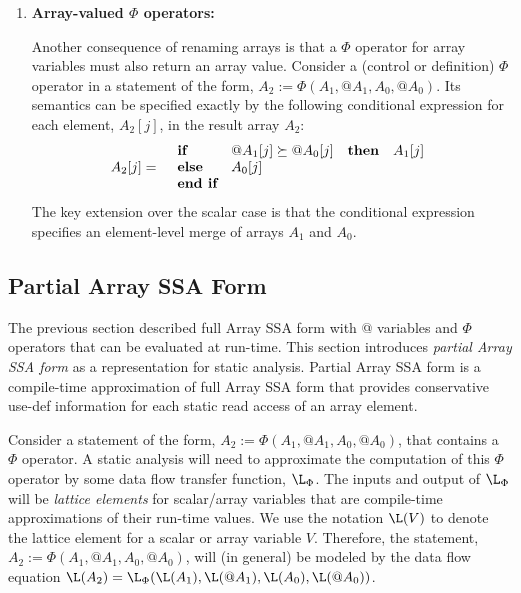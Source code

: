 \begin{enumerate}
\item {\bf Array-valued  $\Phi$ operators:}
\label{array:phi}

Another consequence of renaming arrays is that
a $\Phi$ operator
for array variables must also return an
array value.  Consider a (control or definition) $\Phi$ operator in
a statement of
the form, $A_2 := \Phi(A_1, @A_1, A_0, @A_0)$. Its semantics can be specified exactly
by the following conditional expression
for each element, $A_2[j]$, in the result array $A_2$:
\begin{eqnarray*}
A_2[j] & = &
  \begin{array}{llll}
\mbox{\bf if} & @A_1[j] \succeq @A_0[j] & {\bf then} & A_1[j] \\
\mbox{\bf else} & A_0[j] \\
\mbox{\bf end if}
  \end{array}
\end{eqnarray*}
The key extension over the scalar case is that the conditional expression
specifies an element-level merge of arrays $A_1$ and $A_0$.
\end{enumerate}

\subsection{Partial Array SSA Form}\label{sec:partial}

The previous section described full Array SSA form with @ variables
and $\Phi$ operators that can be evaluated at run-time.
This section introduces {\it partial Array SSA form}
as a  representation for static analysis.  Partial Array SSA form 
is a compile-time approximation of full Array SSA form that provides
conservative use-def information for each static
read access of an array element.

Consider a statement of the form, $A_2 := \Phi(A_1, @A_1, A_0, @A_0)$,
that contains a $\Phi$ operator.
A static analysis will need to 
approximate
the computation of this $\Phi$ operator by 
some data flow transfer function, $\L_{\Phi}$.
The inputs and output of $\L_{\Phi}$ will be
{\it lattice elements} for scalar/array variables that
are compile-time approximations of their run-time values.
We use the notation $\L(V)$ to denote the lattice element for 
a scalar or array
variable $V$.
Therefore, the 
statement, $A_2 := \Phi(A_1, @A_1, A_0, @A_0)$, will (in general)
be modeled by the data flow equation 
$\L(A_2) = \L_{\Phi}(\L(A_1), \L(@A_1), \L(A_0), \L(@A_0))$.

